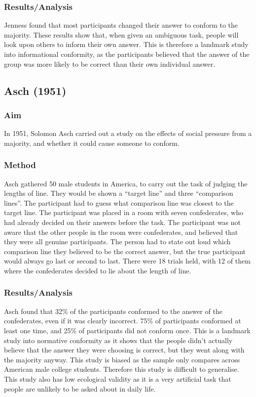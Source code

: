 \documentclass{article}
\begin{document}
\subsubsection{Results/Analysis}
Jenness found that most participants changed their answer to conform to the majority. These results show that, when given an ambiguous task, people will look upon others to inform their own answer.  This is therefore a landmark study into informational conformity, as the participants believed that the answer of the group was more likely to be correct than their own individual answer.
\subsection{Asch (1951)}
\subsubsection{Aim}
In 1951, Solomon Asch carried out a study on the effects of social pressure from a majority, and whether it could cause someone to conform.
\subsubsection{Method}
Asch gathered 50 male students in America, to carry out the task of judging the lengths of line. They would be shown a “target line” and three “comparison lines”. The participant had to guess what comparison line was closest to the target line. The participant was placed in a room with seven confederates, who had already decided on their answers before the task. The participant was not aware that the other people in the room were confederates, and believed that they were all genuine participants. The person had to state out loud which comparison line they believed to be the correct answer, but the true participant would always go last or second to last. There were 18 trials held, with 12 of them where the confederates decided to lie about the length of line.
\subsubsection{Results/Analysis}
Asch found that 32\% of the participants conformed to the answer of the confederates, even if it was clearly incorrect. 75\% of participants conformed at least one time, and 25\% of participants did not conform once. This is a landmark study into normative conformity as it shows that the people didn’t actually believe that the answer they were choosing is correct, but they went along with the majority anyway. This study is biased as the sample only compares across American male college students. Therefore this study is difficult to generalise. This study also has low ecological validity as it is a very artificial task that people are unlikely to be asked about in daily life.
\end{document}
